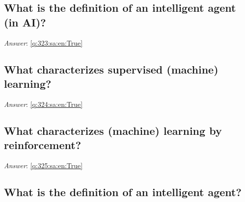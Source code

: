 \documentclass[a4paper,11pt,oneside]{article}
\begin{document}
\begin{sloppypar}
\subsection{What is the definition of an intelligent agent (in AI)?}

\label{q:323:sa:en:False}

\vspace{2cm}

\noindent\makebox[\textwidth]{\hrulefill}

\vspace{1cm}

\textit{Answer}: \autoref{q:323:sa:en:True}



\subsection{What characterizes supervised (machine) learning?}

\label{q:324:sa:en:False}

\vspace{2cm}

\noindent\makebox[\textwidth]{\hrulefill}

\vspace{1cm}

\textit{Answer}: \autoref{q:324:sa:en:True}



\subsection{What characterizes (machine) learning by reinforcement?}

\label{q:325:sa:en:False}

\vspace{2cm}

\noindent\makebox[\textwidth]{\hrulefill}

\vspace{1cm}

\textit{Answer}: \autoref{q:325:sa:en:True}



\subsection{What is the definition of an intelligent agent?}

\label{q:326:sa:en:False}

\vspace{2cm}


\end{sloppypar}
\end{document}
